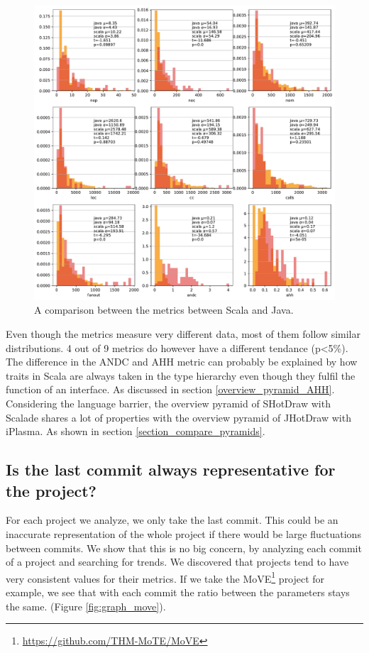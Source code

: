 \documentclass[onecolumn]{article}
\begin{document}
\begin{figure}[H]
  \centering
  \includegraphics[width = \linewidth]{fig/hist_ratios/simple_java_scala.pdf}
  \caption{A comparison between the metrics between Scala and Java.}
  \label{fig:simple_java_scala}
\end{figure}


Even though the metrics measure very different data, most of them follow similar distributions. 4 out of 9 metrics do however have a different tendance (p<5\%). The difference in the ANDC and AHH metric can probably be explained by how traits in Scala are always taken in the type hierarchy even though they fulfil the function of an interface. As discussed in section \ref{overview_pyramid_AHH}. Considering the language barrier, the overview pyramid of SHotDraw with Scalade shares a lot of properties with the overview pyramid of JHotDraw with iPlasma. As shown in section \ref{section_compare_pyramids}. 


\subsection{Is the last commit always representative for the project?}
For each project we analyze, we only take the last commit. This could be an inaccurate representation of the whole project if there would be large fluctuations between commits. We show that this is no big concern, by analyzing each commit of a project and searching for trends. We discovered that projects tend to have very consistent values for their metrics. If we take the MoVE\footnote{\url{https://github.com/THM-MoTE/MoVE}} project for example, we see that with each commit the ratio between the parameters stays the same. (Figure \ref{fig:graph_move}).
\end{document}
